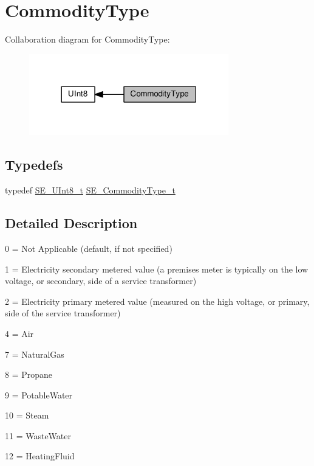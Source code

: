 \hypertarget{group__CommodityType}{}\section{Commodity\+Type}
\label{group__CommodityType}
Collaboration diagram for Commodity\+Type\+:\nopagebreak
\begin{figure}[H]
\begin{center}
\leavevmode
\includegraphics[width=246pt]{group__CommodityType}
\end{center}
\end{figure}
\subsection*{Typedefs}
\begin{DoxyCompactItemize}
\item 
typedef \hyperlink{group__UInt8_gaf7c365a1acfe204e3a67c16ed44572f5}{S\+E\+\_\+\+U\+Int8\+\_\+t} \hyperlink{group__CommodityType_ga8c7268080f04fe151221243d3c68eb8c}{S\+E\+\_\+\+Commodity\+Type\+\_\+t}
\end{DoxyCompactItemize}


\subsection{Detailed Description}
0 = Not Applicable (default, if not specified)

1 = Electricity secondary metered value (a premises meter is typically on the low voltage, or secondary, side of a service transformer)

2 = Electricity primary metered value (measured on the high voltage, or primary, side of the service transformer)

4 = Air

7 = Natural\+Gas

8 = Propane

9 = Potable\+Water

10 = Steam

11 = Waste\+Water

12 = Heating\+Fluid

